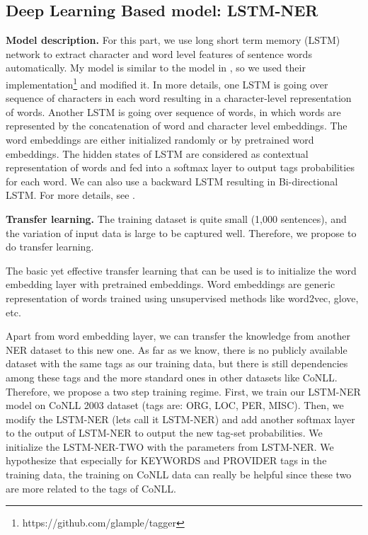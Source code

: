 \documentclass[11pt]{article}
\begin{document}
\subsection{Deep Learning Based model: LSTM-NER}
\textbf{Model description.}
For this part, we use
long short term memory (LSTM) network
to extract character and word level features of sentence words
automatically. 
My model is similar to the model in \cite{tagger}, 
so we used their implementation\footnote{https://github.com/glample/tagger} and modified it.
In more details, 
one LSTM is going over sequence of characters in each word resulting in a 
character-level representation of words. 
Another LSTM is going over sequence of words, in which words are represented 
by the concatenation of word and character level embeddings. 
The word embeddings are either initialized randomly or by pretrained word embeddings. 
The hidden states of LSTM are considered as contextual representation of
words and fed into a softmax layer to output tags probabilities for each word. 
We can also use a backward LSTM resulting in Bi-directional LSTM.
For more details, see .

\textbf{Transfer learning.}
The training dataset is quite small (1,000 sentences), 
and the variation of input data is large to be captured well.
Therefore, we propose to do transfer learning. 

The basic yet effective transfer learning that can be used is to 
initialize the word embedding layer with pretrained 
embeddings. 
Word embeddings are generic representation of words trained using unsupervised methods 
like word2vec, glove, etc. 

Apart from word embedding layer, we can transfer the knowledge from 
another NER dataset to this new one. 
As far as we know, there is no publicly available dataset with the same tags 
as our training data, but there is still dependencies among these tags
and the more standard ones in other datasets like CoNLL. 
Therefore, we propose a two step training regime. 
First, we train our LSTM-NER model on CoNLL 2003 dataset (tags are: ORG, LOC, PER, MISC).
Then, we modify the LSTM-NER (lets call it LSTM-NER)
and add another softmax layer to the output of LSTM-NER
to output the new tag-set probabilities. 
We initialize the LSTM-NER-TWO with the parameters 
from LSTM-NER.
We hypothesize that especially for KEYWORDS and PROVIDER tags in the training data,
the training on CoNLL data can really be helpful since 
these two are more related to the tags of CoNLL.
\end{document}

